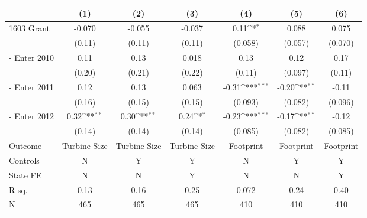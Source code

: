 {
\def\sym#1{\ifmmode^{#1}\else\(^{#1}\)\fi}
\begin{tabular}{l*{6}{c}}
\toprule
                &\multicolumn{1}{c}{(1)}         &\multicolumn{1}{c}{(2)}         &\multicolumn{1}{c}{(3)}         &\multicolumn{1}{c}{(4)}         &\multicolumn{1}{c}{(5)}         &\multicolumn{1}{c}{(6)}         \\
\midrule
1603 Grant      &   -0.070         &   -0.055         &   -0.037         &     0.11\sym{*}  &    0.088         &    0.075         \\
                &   (0.11)         &   (0.11)         &   (0.11)         &  (0.058)         &  (0.057)         &  (0.070)         \\
\addlinespace
1603 - Enter 2010&     0.11         &     0.13         &    0.018         &     0.13         &     0.12         &     0.17         \\
                &   (0.20)         &   (0.21)         &   (0.22)         &   (0.11)         &  (0.097)         &   (0.11)         \\
\addlinespace
1603 - Enter 2011&     0.12         &     0.13         &    0.063         &    -0.31\sym{***}&    -0.20\sym{**} &    -0.11         \\
                &   (0.16)         &   (0.15)         &   (0.15)         &  (0.093)         &  (0.082)         &  (0.096)         \\
\addlinespace
1603 - Enter 2012&     0.32\sym{**} &     0.30\sym{**} &     0.24\sym{*}  &    -0.23\sym{***}&    -0.17\sym{**} &    -0.12         \\
                &   (0.14)         &   (0.14)         &   (0.14)         &  (0.085)         &  (0.082)         &  (0.085)         \\
\midrule
Outcome         &Turbine Size         &Turbine Size         &Turbine Size         &Footprint         &Footprint         &Footprint         \\
Controls        &        N         &        Y         &        Y         &        N         &        Y         &        Y         \\
State FE        &        N         &        N         &        Y         &        N         &        N         &        Y         \\
R-sq.           &     0.13         &     0.16         &     0.25         &    0.072         &     0.24         &     0.40         \\
N               &      465         &      465         &      465         &      410         &      410         &      410         \\
\bottomrule
\end{tabular}
}
